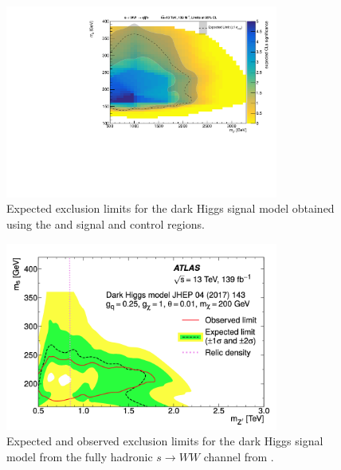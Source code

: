 \begin{figure}[h]
    \centering
    \includegraphics[width=0.8\textwidth]{Figures/5/fits/COMBO.pdf}
    \caption{Expected exclusion limits for the dark Higgs signal model obtained using the \merged and \resolved signal and control regions.}
    \label{fig:excl_comb}
\end{figure}

\begin{figure}[h]
    \centering
    \includegraphics[width=0.8\textwidth]{Figures/5/had_analy_contour.png}
    \caption{Expected and observed exclusion limits for the dark Higgs signal model from the fully hadronic $s\rightarrow WW$ channel from \cite{had_analy}.}
    \label{fig:had_sens}
\end{figure}
